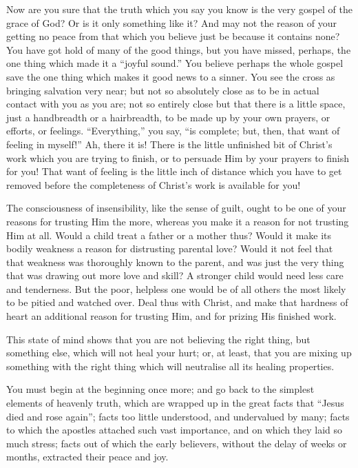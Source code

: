\documentclass[
]{book}
\begin{document}
Now are you sure that the truth which you say you know is the very gospel of the grace of God? Or is it only something like it? And may not the reason of your getting no peace from that which you believe just be because it contains none? You have got hold of many of the good things, but you have missed, perhaps, the one thing which made it a ``joyful sound.'' You believe perhaps the whole gospel save the one thing which makes it good news to a sinner. You see the cross as bringing salvation very near; but not so absolutely close as to be in actual contact with you as you are; not so entirely close but that there is a little space, just a handbreadth or a hairbreadth, to be made up by your own prayers, or efforts, or feelings. ``Everything,'' you say, ``is complete; but, then, that want of feeling in myself!'' Ah, there it is! There is the little unfinished bit of Christ's work which you are trying to finish, or to persuade Him by your prayers to finish for you! That want of feeling is the little inch of distance which you have to get removed before the completeness of Christ's work is available for you!

The consciousness of insensibility, like the sense of guilt, ought to be one of your reasons for trusting Him the more, whereas you make it a reason for not trusting Him at all. Would a child treat a father or a mother thus? Would it make its bodily weakness a reason for distrusting parental love? Would it not feel that that weakness was thoroughly known to the parent, and was just the very thing that was drawing out more love and skill? A stronger child would need less care and tenderness. But the poor, helpless one would be of all others the most likely to be pitied and watched over. Deal thus with Christ, and make that hardness of heart an additional reason for trusting Him, and for prizing His finished work.

This state of mind shows that you are not believing the right thing, but something else, which will not heal your hurt; or, at least, that you are mixing up something with the right thing which will neutralise all its healing properties.

You must begin at the beginning once more; and go back to the simplest elements of heavenly truth, which are wrapped up in the great facts that ``Jesus died and rose again''; facts too little understood, and undervalued by many; facts to which the apostles attached such vast importance, and on which they laid so much stress; facts out of which the early believers, without the delay of weeks or months, extracted their peace and joy.
\end{document}
